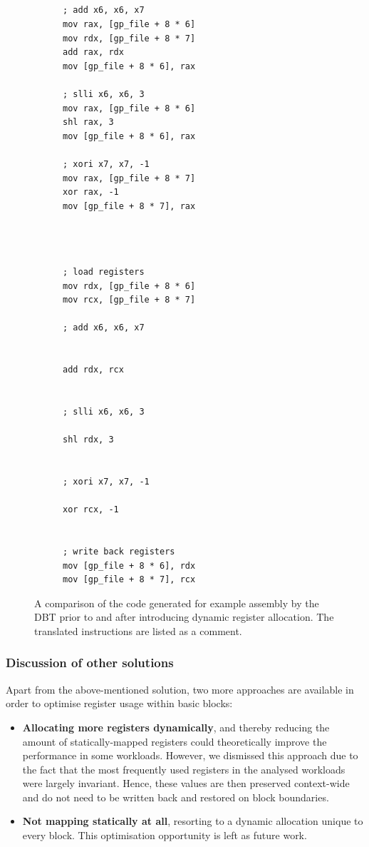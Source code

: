 \begin{figure}[h]
\begin{subfigure}{0.45\textwidth}
\begin{lstlisting}[label={lst:without-lazy-replace}, showlines=true]




; add x6, x6, x7
mov	rax, [gp_file + 8 * 6]
mov	rdx, [gp_file + 8 * 7]
add	rax, rdx
mov	[gp_file + 8 * 6], rax

; slli x6, x6, 3
mov	rax, [gp_file + 8 * 6]
shl	rax, 3
mov	[gp_file + 8 * 6], rax

; xori x7, x7, -1
mov	rax, [gp_file + 8 * 7]
xor	rax, -1
mov	[gp_file + 8 * 7], rax




\end{lstlisting}
\end{subfigure}
\hfill
\begin{subfigure}{0.45\textwidth}
\begin{lstlisting}[label={lst:with-lazy-replace}, showlines=true]
; load registers
mov rdx, [gp_file + 8 * 6]
mov rcx, [gp_file + 8 * 7]

; add x6, x6, x7


add	rdx, rcx


; slli x6, x6, 3

shl	rdx, 3


; xori x7, x7, -1

xor	rcx, -1


; write back registers
mov [gp_file + 8 * 6], rdx
mov [gp_file + 8 * 7], rcx
\end{lstlisting}
\end{subfigure}
\label{fig:lazy-replace-code}
\caption[Example assembly for dynamic register allocation]%
{A comparison of the code generated for example assembly by the DBT prior to and after introducing dynamic register allocation. The translated instructions are listed as a comment.}
\end{figure}


\subsubsection{Discussion of other solutions}
Apart from the above-mentioned solution, two more approaches are available in order to optimise register usage within basic blocks:
\begin{itemize}
	\item \textbf{Allocating more registers dynamically}, and thereby reducing the amount of statically-mapped registers could theoretically improve the performance in some workloads.
	However, we dismissed this approach due to the fact that the most frequently used registers in the analysed workloads were largely invariant.
	Hence, these values are then preserved context-wide and do not need to be written back and restored on block boundaries.
	
	\item \textbf{Not mapping statically at all}, resorting to a dynamic allocation unique to every block.
	This optimisation opportunity is left as future work.
\end{itemize}

